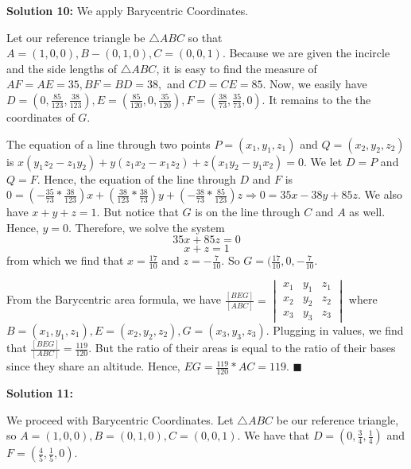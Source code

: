 \documentclass{article}
\begin{document}
\textbf{Solution 10:}
We apply Barycentric Coordinates.

Let our reference triangle be $\triangle ABC$ so that $A=(1,0,0),B-(0,1,0),C=(0,0,1)$. Because we are given the incircle and the side lengths of $\triangle ABC$, it is easy to find the measure of $AF=AE=35,BF=BD=38,$ and $CD=CE=85$. Now, we easily have $D=(0,\frac{85}{123},\frac{38}{123}), E=(\frac{85}{120},0,\frac{35}{120}), F=(\frac{38}{73},\frac{35}{73},0)$. It remains to the the coordinates of $G$.

The equation of a line through two points $P=(x_1,y_1,z_1)$ and $Q=(x_2,y_2,z_2)$ is $x(y_1z_2 -z_1y_2)+y(z_1x_2-x_1z_2)+z(x_1y_2-y_1x_2)=0$. We let $D=P$ and $Q=F$. Hence, the equation of the line through $D$ and $F$ is $0=(-\frac{35}{73}*\frac{38}{123})x+(\frac{38}{123}*\frac{38}{73})y+(-\frac{38}{73}*\frac{85}{123})z \Rightarrow 0=35x-38y+85z$. We also have $x+y+z=1$. But notice that $G$ is on the line through $C$ and $A$ as well. Hence, $y=0$. Therefore, we solve the system$$35x+85z=0$$$$x+z=1$$from which we find that $x=\frac{17}{10}$ and $z=-\frac{7}{10}$. So $G=(\frac{17}{10},0,-\frac{7}{10}$.

From the Barycentric area formula, we have $\frac{[BEG]}{[ABC]}=\begin{vmatrix}
x_{1} &y_{1}  &z_{1} \\ 
x_{2} &y_{2}  &z_{2} \\ 
 x_{3}& y_{3} & z_{3}
\end{vmatrix}$ where $B=(x_{1}, y_{1}  ,z_{1}), E=(x_{2} ,y_{2}  ,z_{2}),G= (x_{3}, y_{3} ,z_{3}).$ Plugging in values, we find that $\frac{[BEG]}{[ABC]}=\frac{119}{120}$. But the ratio of their areas is equal to the ratio of their bases since they share an altitude. Hence, $EG=\frac{119}{120}*AC=119$. $\blacksquare$
\vspace{.2in}


\textbf{Solution 11:}

We proceed with Barycentric Coordinates. Let $\triangle ABC$ be our reference triangle, so $A=(1,0,0),B=(0,1,0),C=(0,0,1)$. We have that $D=(0,\frac 34,\frac 14)$ and $F=(\frac 45, \frac 15, 0)$.
\end{document}
